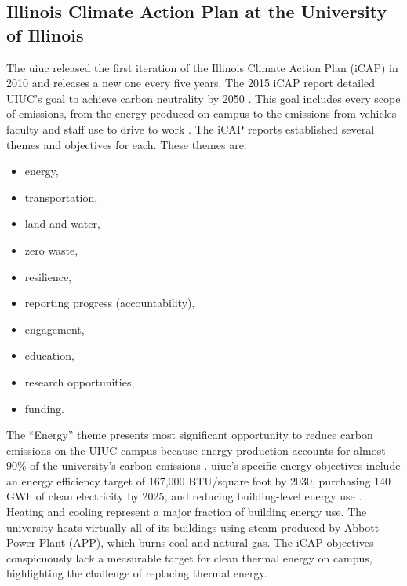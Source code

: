 \subsection{Illinois Climate Action Plan at the University of Illinois}

The \gls{uiuc} released the first iteration
of the Illinois Climate Action Plan (iCAP) in 2010 and releases a new one every five years.
The 2015 iCAP report detailed UIUC’s goal to achieve carbon neutrality by 2050
\cite{institute_for_sustainability_energy_and_environment_illinois_2015}.
This goal includes every scope of emissions, from the energy produced on campus to
the emissions from vehicles faculty and staff use to drive to work
\cite{institute_for_sustainability_energy_and_environment_illinois_2015,
institute_for_sustainability_energy_and_environment_illinois_2020}. The
iCAP reports established several themes and objectives for each. These themes are:
\begin{itemize}
  \item energy,
  \item transportation,
  \item land and water,
  \item zero waste,
  \item resilience,
  \item reporting progress (accountability),
  \item engagement,
  \item education,
  \item research opportunities,
  \item funding.
\end{itemize}
The ``Energy'' theme presents most significant opportunity to reduce carbon emissions
on the UIUC campus because energy production accounts for almost 90\% of the university's
carbon emissions \cite{institute_for_sustainability_energy_and_environment_illinois_2015}.
\gls{uiuc}’s specific energy objectives include an energy
efficiency target of 167,000 BTU/square foot by 2030, purchasing 140 GWh of clean
electricity by 2025, and reducing building-level energy use
\cite{institute_for_sustainability_energy_and_environment_illinois_2020}. Heating
and cooling represent a major fraction of building energy use.
The university heats virtually all of its buildings using steam produced by Abbott
Power Plant (APP), which burns coal and natural gas. The iCAP objectives conspicuously
lack a measurable target for clean thermal energy on campus, highlighting the
challenge of replacing thermal energy.

